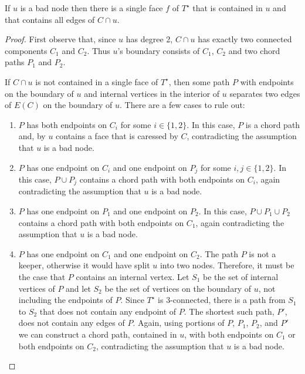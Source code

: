 \documentclass[a4paper,UKenglish]{socg-lipics-v2019}
\newcommand{\dual}[1]{{#1}^\star}
\begin{document}
\begin{lem}
   If $u$ is a bad node then there is a single face $f$ of $\dual{T}$
   that is contained in $u$ and that contains all edges of $C\cap u$.
\end{lem}

\begin{proof}
   First observe that, since $u$ has degree 2, $C\cap u$ has exactly
   two connected components $C_1$ and $C_2$. Thus $u$'s boundary
   consists of $C_1$, $C_2$ and two chord paths $P_1$ and $P_2$.

   If $C\cap u$ is not contained in a single face of $\dual{T}$, then
   some path $P$ with endpoints on the boundary of $u$ and internal
   vertices in the interior of $u$ separates two edges of $E(C)$ on the
   boundary of $u$.  There are a few cases to rule out:
   \begin{enumerate}
       \item $P$ has both endpoints on $C_i$ for some $i\in\{1,2\}$. In
       this case, $P$ is a chord path and, by 
       $u$ contains a face that is caressed by $C$, contradicting the
       assumption that $u$ is a bad node.

       \item $P$ has one endpoint on $C_i$ and one endpoint on $P_j$
       for some $i,j\in\{1,2\}$.  In this case, $P\cup P_j$ contains a
       chord path with both endpoints on $C_i$, again contradicting the
       assumption that $u$ is a bad node.

       \item $P$ has one endpoint on $P_1$ and one endpoint on $P_2$.
       In this case, $P\cup P_1\cup P_2$ contains a chord path with both
       endpoints on $C_1$, again contradicting the assumption that $u$
       is a bad node.

       \item $P$ has one endpoint on $C_1$ and one endpoint on $C_2$.
       The path $P$ is not a keeper, otherwise it would have split $u$
       into two nodes.	Therefore, it must be the case that $P$ contains
       an internal vertex.  Let $S_1$ be the set of internal vertices
       of $P$ and let $S_2$ be the set of vertices on the boundary
       of $u$, not including the endpoints of $P$.  Since $\dual{T}$
       is 3-connected, there is a path from $S_1$ to $S_2$ that does
       not contain any endpoint of $P$.  The shortest such path, $P'$,
       does not contain any edges of $P$.  Again, using portions of $P$,
       $P_1$, $P_2$, and $P'$ we can construct a chord path, contained
       in $u$, with both endpoints on $C_1$ or both endpoints on $C_2$,
       contradicting the assumption that $u$ is a bad node.
\end{enumerate}
\end{proof}
\end{document}
